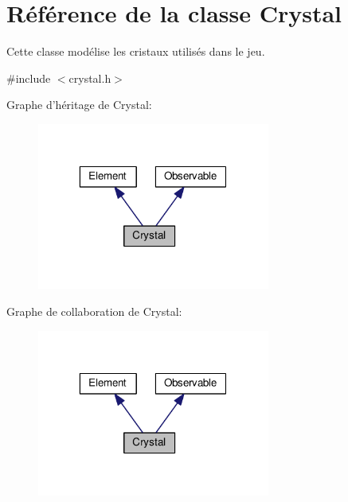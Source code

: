 \hypertarget{classCrystal}{\section{Référence de la classe Crystal}
\label{classCrystal}
}


Cette classe modélise les cristaux utilisés dans le jeu.  




{\ttfamily \#include $<$crystal.\+h$>$}



Graphe d'héritage de Crystal\+:
\nopagebreak
\begin{figure}[H]
\begin{center}
\leavevmode
\includegraphics[width=217pt]{de/da2/classCrystal__inherit__graph}
\end{center}
\end{figure}


Graphe de collaboration de Crystal\+:
\nopagebreak
\begin{figure}[H]
\begin{center}
\leavevmode
\includegraphics[width=217pt]{d4/db0/classCrystal__coll__graph}
\end{center}
\end{figure}
